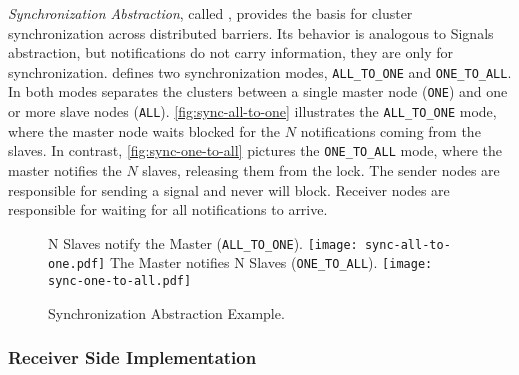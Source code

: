 			\textit{Synchronization Abstraction}, called \sync, provides the
			basis for cluster synchronization across distributed barriers.
			Its behavior is analogous to \posix Signals abstraction, but
			notifications do not carry information, they are only for synchronization.
			\sync defines two synchronization modes, \texttt{ALL\_TO\_ONE} and
			\texttt{ONE\_TO\_ALL}. In both modes separates the clusters between
			a single master node (\texttt{ONE}) and one or more slave nodes
			(\texttt{ALL}). \autoref{fig:sync-all-to-one} illustrates the
			\texttt{ALL\_TO\_ONE} mode, where the master node waits blocked for
			the $N$ notifications coming from the slaves. In contrast,
			\autoref{fig:sync-one-to-all} pictures the \texttt{ONE\_TO\_ALL} mode,
			where the master notifies the $N$ slaves, releasing them from the lock.
			The sender nodes are responsible for sending a signal and never will
			block. Receiver nodes are responsible for waiting for all notifications
			to arrive.

			\begin{figure}[!tb]
				\centering%
				\caption{Synchronization Abstraction Example.}%
				\label{fig:sync-concepts}%

					{N Slaves notify the Master (\texttt{ALL\_TO\_ONE}).}%
					{\texttt{[image: sync-all-to-one.pdf]}}%
				\hspace{1cm}%
					{The Master notifies N Slaves (\texttt{ONE\_TO\_ALL}).}%
					{\texttt{[image: sync-one-to-all.pdf]}}%

			\end{figure}

			\subsubsection{Receiver Side Implementation}


